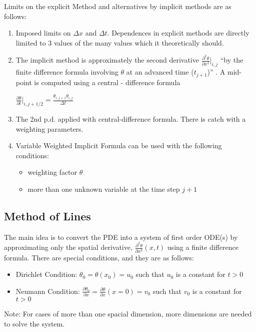 \documentclass[11pt]{article}
\begin{document}
Limits on the explicit Method and alternatives by implicit methods are as follows:  
\begin{enumerate}
\item Imposed limits on $\Delta x$ and $\Delta t$.  Dependences in explicit methods are directly limited to 3 values of the many values which it theoretically should.
\item The implicit method is approximately the second derivative $\frac{ \partial ^2 \theta }{\partial x^2} |_{i,j} $ ``by the finite difference formula involving $\theta$ at an advanced time ($t_{j+1}$)''  \cite {appliedmethods}.  A mid-point is computed using a central - difference formula 

	$\frac{\partial \theta}{\partial t} | _{i,j+1/2} = \frac {\theta_{i,j+1}  \theta_{i,j} }{\Delta t}$
	
\item The 2nd p.d. applied with central-difference formula.  There is catch with a weighting parameters.  
\item Variable Weighted Implicit Formula can be used with the following conditions:
\begin{itemize}
\item weighting factor $\theta$
\item more than one unknown variable at the time step $ j+1$
\end{itemize}

\end{enumerate}


\subsection {Method of Lines}
 The main idea is to convert the PDE into a system of first order ODE(s) by approximating only the spatial derivative, $\frac {\partial ^2 \theta}{\partial x^2} (x,t)$ using a finite difference formula.   There are special conditions, and they are as follows:
 \begin{itemize}
\item Dirichlet Condition: $\theta _0 = \theta (x_0) = u_0 $ such that $u_0$  is a constant for $t>0$
 \item Neumann Condition: $\frac{\partial \theta_0}{ \partial x} = \frac{\partial \theta}{ \partial x}  (x=0) = v_0 $ such that $v_0$ is a constant for $t>0$ 
\end{itemize}

Note: For cases of more than one spacial dimension, more dimensions are needed to solve the system. 
\end{document}
